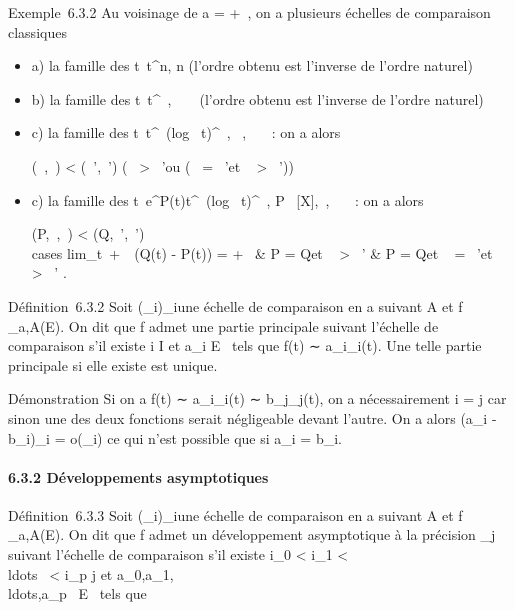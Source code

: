 \documentclass[]{article}
\begin{document}
Exemple~6.3.2 Au voisinage de a = +\infty~, on a plusieurs échelles de
comparaison classiques

\begin{itemize}
\item
  a) la famille des t\mapsto~t^n, n \in {}
  (l'ordre obtenu est l'inverse de l'ordre naturel)
\item
  b) la famille des t\mapsto~t^\alpha~, \alpha~ \in {}~
  (l'ordre obtenu est l'inverse de l'ordre naturel)
\item
  c) la famille des
  t\mapsto~t^\alpha~(log~
  t)^\beta~, \alpha~,\beta~ \in {}~~: on a alors

  (\alpha~,\beta~) < (\alpha~',\beta~') \Leftrightarrow
  \bigl (\alpha~ > \alpha~'\text ou
  (\alpha~ = \alpha~'\text et \beta~ >
  \beta~')\bigr )
\item
  c) la famille des
  t\mapsto~e^P(t)t^\alpha~(log~
  t)^\beta~, P \in {}~[X],\alpha~,\beta~ \in {}~~: on a alors

  (P,\alpha~,\beta~) < (Q,\alpha~',\beta~') \Leftrightarrow
  \left \\cases
  lim_t\rightarrow~+\infty~~(Q(t) - P(t)) = +\infty~
  \cr \cr \textou &
  \cr P = Q\text et \alpha~ >
  \alpha~' \cr \textou & \cr
  P = Q\text et \alpha~ = \alpha~'\text et \beta~
  > \beta~'  \right .
\end{itemize}

Définition~6.3.2 Soit (\phi_i)_i\inI une échelle de
comparaison en a suivant A et f _a,A(E). On dit que f admet
une partie principale suivant l'échelle de comparaison s'il existe i \in I
et a_i \in E \diagdown\0\ tels que f(t)
∼ a_i\phi_i(t). Une telle partie principale si elle
existe est unique.

Démonstration Si on a f(t) ∼ a_i\phi_i(t) ∼
b_j\phi_j(t), on a nécessairement i = j car sinon une des
deux fonctions serait négligeable devant l'autre. On a alors
(a_i - b_i)\phi_i = o(\phi_i) ce qui n'est
possible que si a_i = b_i.

\paragraph{6.3.2 Développements asymptotiques}

Définition~6.3.3 Soit (\phi_i)_i\inI une échelle de
comparaison en a suivant A et f _a,A(E). On dit que f admet
un développement asymptotique à la précision \phi_j suivant
l'échelle de comparaison s'il existe i_0 <
i_1 <
\\ldots~ <
i_p \leq j et
a_0,a_1,\\ldots,a_p~
\in E \diagdown\0\ tels que
\end{document}
